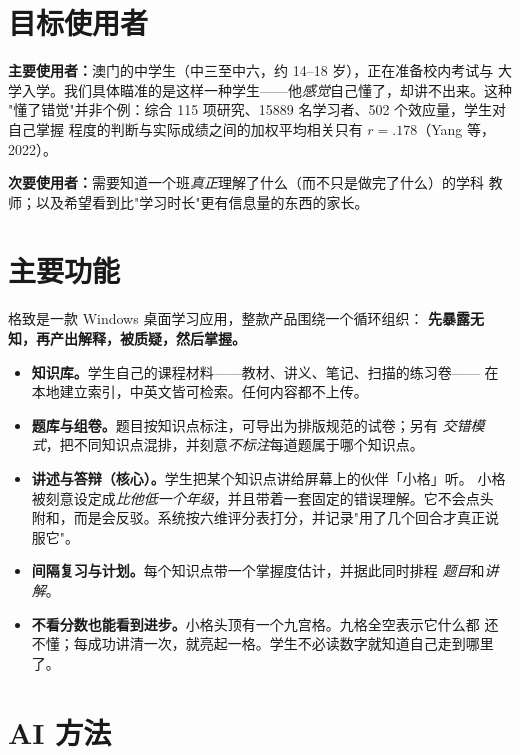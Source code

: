 \documentclass[11pt,a4paper,UTF8,fontset=windows]{ctexart}
\begin{document}
\section{目标使用者}

\textbf{主要使用者：}澳门的中学生（中三至中六，约 14--18 岁），正在准备校内考试与
大学入学。我们具体瞄准的是这样一种学生——他\emph{感觉}自己懂了，却讲不出来。这种
"懂了错觉"并非个例：综合 115 项研究、15889 名学习者、502 个效应量，学生对自己掌握
程度的判断与实际成绩之间的加权平均相关只有 \(r = .178\)（Yang 等，2022）。

\textbf{次要使用者：}需要知道一个班\emph{真正}理解了什么（而不只是做完了什么）的学科
教师；以及希望看到比"学习时长"更有信息量的东西的家长。

\section{主要功能}

格致是一款 Windows 桌面学习应用，整款产品围绕一个循环组织：
\textbf{先暴露无知，再产出解释，被质疑，然后掌握。}

\begin{itemize}
  \item \textbf{知识库。}学生自己的课程材料——教材、讲义、笔记、扫描的练习卷——
  在本地建立索引，中英文皆可检索。任何内容都不上传。
  \item \textbf{题库与组卷。}题目按知识点标注，可导出为排版规范的试卷；另有
  \emph{交错模式}，把不同知识点混排，并刻意\emph{不标注}每道题属于哪个知识点。
  \item \textbf{讲述与答辩（核心）。}学生把某个知识点讲给屏幕上的伙伴「小格」听。
  小格被刻意设定成\emph{比他低一个年级}，并且带着一套固定的错误理解。它不会点头
  附和，而是会反驳。系统按六维评分表打分，并记录"用了几个回合才真正说服它"。
  \item \textbf{间隔复习与计划。}每个知识点带一个掌握度估计，并据此同时排程
  \emph{题目}和\emph{讲解}。
  \item \textbf{不看分数也能看到进步。}小格头顶有一个九宫格。九格全空表示它什么都
  还不懂；每成功讲清一次，就亮起一格。学生不必读数字就知道自己走到哪里了。
\end{itemize}

\section{AI 方法}
\end{document}
